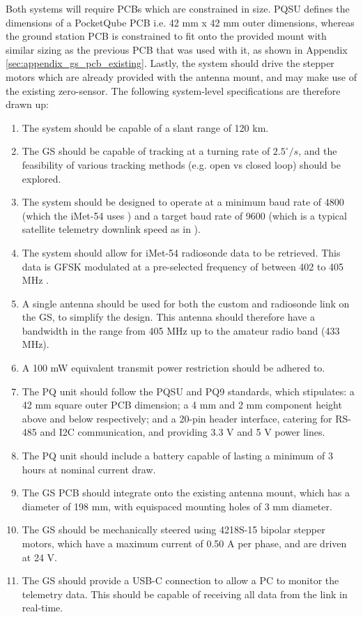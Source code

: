 Both systems will require PCBs which are constrained in size. PQSU defines the dimensions of a PocketQube PCB i.e. 42 mm x 42 mm outer dimensions, whereas the ground station PCB is constrained to fit onto the provided mount with similar sizing as the previous PCB that was used with it, as shown in Appendix \ref{sec:appendix_gs_pcb_existing}. Lastly, the system should drive the stepper motors which are already provided with the antenna mount, and may make use of the existing zero-sensor. The following system-level specifications are therefore drawn up:
\begin{enumerate}
    \item The system should be capable of a slant range of 120 km.
    \item The GS should be capable of tracking at a turning rate of $2.5^\circ / s$, and the feasibility of various tracking methods (e.g. open vs closed loop) should be explored.
    \item The system should be designed to operate at a minimum baud rate of 4800 (which the iMet-54 uses \cite{datasheet-iMet54}) and a target baud rate of 9600 (which is a typical satellite telemetry downlink speed as in \cite{paper-deployableAntenna}).
    \item The system should allow for iMet-54 radiosonde data to be retrieved. This data is GFSK modulated at a pre-selected frequency of between 402 to 405 MHz \cite{datasheet-iMet54}.
    \item A single antenna should be used for both the custom and radiosonde link on the GS, to simplify the design. This antenna should therefore have a bandwidth in the range from 405 MHz up to the amateur radio band (433 MHz).
    \item A 100 mW equivalent transmit power restriction should be adhered to.
    \item The PQ unit should follow the PQSU and PQ9 standards, which stipulates: a 42 mm square outer PCB dimension; a 4 mm and 2 mm component height above and below respectively; and a 20-pin header interface, catering for RS-485 and I2C communication, and providing 3.3 V and 5 V power lines.
    \item The PQ unit should include a battery capable of lasting a minimum of 3 hours at nominal current draw.
    \item The GS PCB should integrate onto the existing antenna mount, which has a diameter of 198 mm, with equispaced mounting holes of 3 mm diameter.
    \item The GS should be mechanically steered using 4218S-15 bipolar stepper motors, which have a maximum current of 0.50 A per phase, and are driven at 24 V.
    \item The GS should provide a USB-C connection to allow a PC to monitor the telemetry data. This should be capable of receiving all data from the link in real-time.
\end{enumerate}